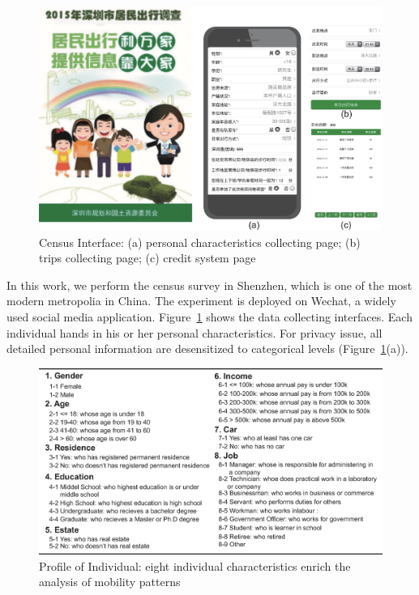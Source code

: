 \begin{figure}[htb!]
 \centering %
 \includegraphics[width=\columnwidth]{pictures/survey_app}
 \caption{Census Interface: (a) personal characteristics collecting page; (b) trips collecting page; (c) credit system page}
 \label{fig:app}
\end{figure}

In this work, we perform the census survey in Shenzhen, which is one of the most modern metropolia in China. The experiment is deployed on Wechat, a widely used social media application. Figure~\ref{fig:app} shows the data collecting interfaces. Each individual hands in his or her personal characteristics. For privacy issue, all detailed personal information are desensitized to categorical levels (Figure~\ref{fig:app}(a)).

\begin{figure}[htb!]
 \centering %
 \includegraphics[width=\columnwidth]{pictures/data_over}
 \caption{Profile of Individual: eight individual characteristics enrich the analysis of mobility patterns}
 \label{fig:data_over}
\end{figure}


